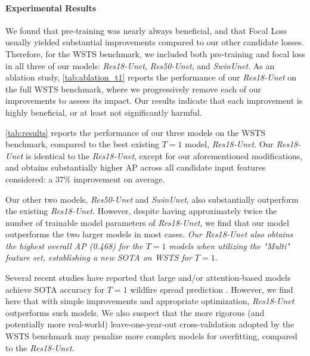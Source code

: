 \paragraph{Experimental Results} We found that pre-training was nearly always beneficial, and that Focal Loss usually yielded substantial improvements compared to our other candidate losses. Therefore, for the WSTS benchmark, we included both pre-training and focal loss in all three of our models: \textit{Res18-Unet}, \textit{Res50-Unet}, and \textit{SwinUnet}. As an ablation study, \cref{tab:ablation_t1} reports the performance of our \textit{Res18-Unet} on the full WSTS benchmark, where we progressively remove each of our improvements to assess its impact. Our results indicate that each improvement is highly beneficial, or at least not significantly harmful.     

\cref{tab:results} reports the performance of our three models on the WSTS benchmark,  compared to the best existing $T=1$ model, \textit{Res18-Unet\cite{gerard2023wildfirespreadts}}. Our \textit{Res18-Unet} is identical to the \textit{Res18-Unet\cite{gerard2023wildfirespreadts}}, except for our aforementioned modifications, and obtains substantially higher AP across all candidate input features considered: a 37\% improvement on average.    

Our other two models, \textit{Res50-Unet} and \textit{SwinUnet}, also substantially outperform the existing \textit{Res18-Unet\cite{gerard2023wildfirespreadts}}. However, despite having approximately twice the number of trainable model parameters of \textit{Res18-Unet}, we find that our model outperforms the two larger models in most cases. \textit{Our Res18-Unet also obtains the highest overall AP (0.468) for the $T=1$ models when utilizing the "Multi" feature set, establishing a new SOTA on WSTS for $T=1$}.  

Several recent studies have reported that large and/or attention-based models achieve SOTA accuracy for $T=1$ wildfire spread prediction \cite{li2024wildfire, zou2023attention, shah2023wildfire, xiao2024wildfire}.  However, we find here that with simple improvements and appropriate optimization, \textit{Res18-Unet} outperforms such models. We also suspect that the more rigorous (and potentially more real-world) leave-one-year-out cross-validation adopted by the WSTS benchmark may penalize more complex models for overfitting, compared to the \textit{Res18-Unet}.     

